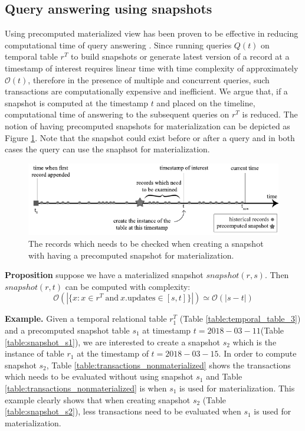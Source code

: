 \subsection{Query answering using snapshots} 

Using precomputed materialized view has been proven to be effective in reducing computational time of query answering \cite{sohrabi2016materialized} \cite{du2017deepsea}. Since running queries $Q(t)$ on temporal table $r^T$ to build snapshots or generate latest version of a record at a timestamp of interest requires linear time with time complexity of approximately $\mathcal{O}(t)$, therefore in the presence of multiple and concurrent queries, such transactions are computationally expensive and inefficient. We argue that, if a snapshot is computed at the timestamp $t$ and placed on the timeline, computational time of answering to the subsequent queries on $r^T$ is reduced. The notion of having precomputed snapshots for materialization can be depicted as Figure \ref{fig:snapshot_materialization}. Note that the snapshot could exist before or after a query and in both cases the query can use the snaphsot for materialization.

\begin{figure}[t]
	\centering
	\includegraphics[width=\textwidth]{figs/snapshot_materialization.pdf}
	\caption{The records which needs to be checked when creating a snapshot with having a precomputed snapshot for materialization.}
	\label{fig:snapshot_materialization}
\end{figure}

\textbf{Proposition} suppose we have a materialized snapshot $snapshot(r,s)$. Then $snapshot(r,t)$ can be computed with complexity:
$$\mathcal{O}(|\{x: x\in r^T\mathrm{\ and\ } x.\mathrm{updates} \in [s,t]\}|) \simeq \mathcal{O}(|s-t|)$$

\textbf{Example.} Given a temporal relational table $r_1^T$ (Table \ref{table:temporal_table_3}) and a precomputed snapshot table $s_1$ at timestamp $t = 2018-03-11$(Table \ref{table:snapshot_s1}), we are interested to create a snapshot $s_2$ which is the instance of table $r_1$ at the timestamp of $t = 2018-03-15$. In order to compute snapshot $s_2$, Table \ref{table:transactions_nonmaterialized} shows the transactions which needs to be evaluated without using snapshot $s_1$ and Table \ref{table:transactions_nonmaterialized} is when $s_1$ is used for materialization. This example clearly shows that when creating snapshot $s_2$ (Table \ref{table:snapshot_s2}), less transactions need to be evaluated when $s_1$ is used for materialization.

